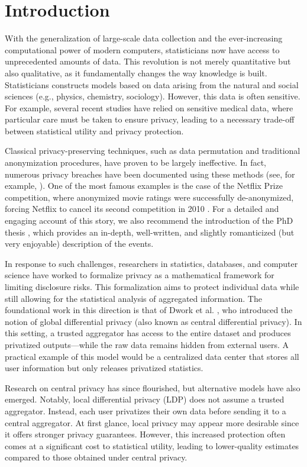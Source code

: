 \documentclass[a4paper, 11pt]{article}
\theoremstyle{definition}
\begin{document}
\section{Introduction}{\label{s: intro}
With the generalization of large-scale data collection and the ever-increasing computational power of modern computers, statisticians now have access to unprecedented amounts of data. This revolution is not merely quantitative but also qualitative, as it fundamentally changes the way knowledge is built. Statisticians constructs models based on data arising from the natural and social sciences (e.g., physics, chemistry, sociology). However, this data is often sensitive. For example, several recent studies have relied on sensitive medical data, %
where particular care must be taken to ensure privacy, leading to a necessary trade-off between statistical utility and privacy protection.

Classical privacy-preserving techniques, such as data permutation and traditional anonymization procedures, have proven to be largely ineffective. In fact, numerous privacy breaches have been documented using these methods (see, for example, \cite{Nar08}). One of the most famous examples is the case of the Netflix Prize competition, where anonymized movie ratings were successfully de-anonymized, forcing Netflix to cancel its second competition in 2010 \cite{KeaRot19}. For a detailed and engaging account of this story, we also recommend the introduction of the PhD thesis \cite{Lal23}, which provides an in-depth, well-written, and slightly romanticized (but very enjoyable) description of the events.

In response to such challenges, researchers in statistics, databases, and computer science have worked to formalize privacy as a mathematical framework for limiting disclosure risks. This formalization aims to protect individual data while still allowing for the statistical analysis of aggregated information. The foundational work in this direction is that of Dwork et al. \cite{Dwo06}, who introduced the notion of global differential privacy (also known as central differential privacy). In this setting, a trusted aggregator has access to the entire dataset and produces privatized outputs—while the raw data remains hidden from external users. A practical example of this model would be a centralized data center that stores all user information but only releases privatized statistics.

Research on central privacy has since flourished, but alternative models have also emerged. Notably, local differential privacy (LDP) does not assume a trusted aggregator. Instead, each user privatizes their own data before sending it to a central aggregator. At first glance, local privacy may appear more desirable since it offers stronger privacy guarantees. However, this increased protection often comes at a significant cost to statistical utility, leading to lower-quality estimates compared to those obtained under central privacy.

}
\end{document}
